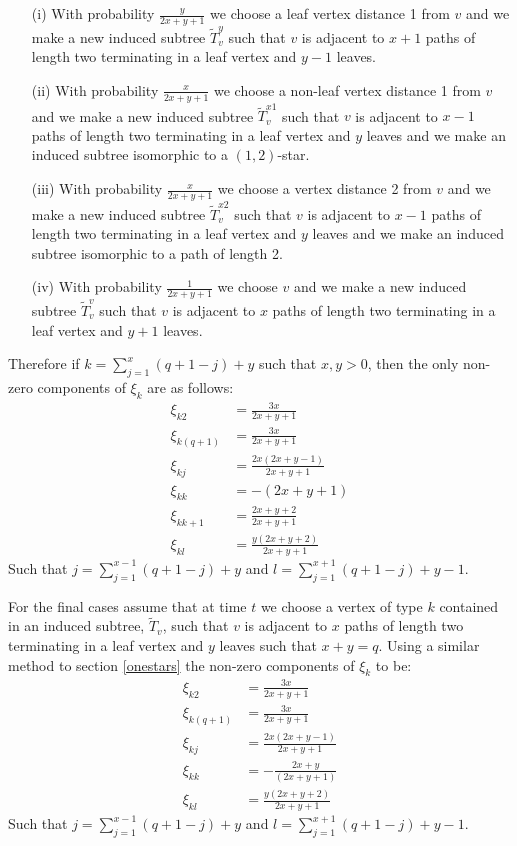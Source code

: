 \documentclass[12pt]{article} %
\theoremstyle{definition}
\begin{document}
\begin{itemize}
\item[(i)] With probability $\frac{y}{2x+y+1}$ we choose a leaf vertex distance 1 from $v$ and we make a new induced subtree $\tilde{T}_{v}^{y}$ such that $v$ is adjacent to $x+1$ paths of length two terminating in a leaf vertex and $y-1$ leaves.     

\item[(ii)] With probability $\frac{x}{2x+y+1}$ we choose a non-leaf vertex distance 1 from $v$ and we make a new induced subtree $\tilde{T}_{v}^{x1}$ such that $v$ is adjacent to $x-1$ paths of length two terminating in a leaf vertex and $y$ leaves and we make an induced subtree isomorphic to a $(1,2)$-star.

\item[(iii)] With probability $\frac{x}{2x+y+1}$ we choose a vertex distance 2 from $v$ and we make a new induced subtree $\tilde{T}_{v}^{x2}$ such that $v$ is adjacent to $x-1$ paths of length two terminating in a leaf vertex and $y$ leaves and we make an induced subtree isomorphic to a path of length 2.  %

\item[(iv)] With probability $\frac{1}{2x+y+1}$ we choose $v$ and we make a new induced subtree $\tilde{T}_{v}^{v}$ such that $v$ is adjacent to $x$ paths of length two terminating in a leaf vertex and $y+1$ leaves.     
\end{itemize}


Therefore if $k= \sum_{j=1}^{x}(q+ 1 -j) + y$ such that $x,y>0$,  then the only non-zero components of $\xi_{k}$ are as follows:
\begin{align*}
\xi_{k2} &= \frac{3x}{2x + y +1}\\
\xi_{k(q+1)} &= \frac{3x}{2x + y +1}\\
\xi_{kj} &= \frac{2x(2x + y -1)}{2x + y +1}\\
\xi_{kk} &= -(2x+y+ 1)\\
\xi_{kk+1}&= \frac{2x+y+2}{2x + y +1}\\
\xi_{kl} &= \frac{y(2x +y + 2)}{2x + y + 1}
\end{align*}
Such that $j = \sum_{j=1}^{x-1}(q+ 1 -j) + y$ and $l = \sum_{j=1}^{x+1}(q+ 1 -j) + y-1.$  

For the final cases assume that at time $t$ we choose a vertex of type $k$ contained in an induced subtree, $\tilde{T}_{v}$, such that $v$ is adjacent to $x$ paths of length two terminating in a leaf vertex and $y$ leaves such that $x+y=q$.  Using a similar method to section \ref{onestars} the non-zero components of $\xi_{k}$ to be:
\begin{align*}
\xi_{k2} &= \frac{3x}{2x + y +1}\\
\xi_{k(q+1)} &= \frac{3x}{2x + y +1}\\
\xi_{kj} &= \frac{2x(2x + y -1)}{2x + y +1}\\
\xi_{kk} &= -\frac{2x + y}{(2x+y+ 1)}\\
\xi_{kl} &= \frac{y(2x +y + 2)}{2x + y + 1}
\end{align*}
Such that $j = \sum_{j=1}^{x-1}(q+ 1 -j) + y$ and $l = \sum_{j=1}^{x+1}(q+ 1 -j) + y-1.$  
\end{document}
